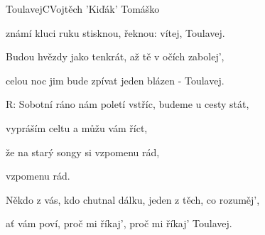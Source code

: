\begin{song}{Toulavej}{C}{Vojtěch 'Kiďák' Tomáško}
\begin{SBVerse}
známí kluci ruku stisknou, řeknou: vítej, Toulavej.

\end{SBVerse}

\begin{SBVerse}

Budou hvězdy jako tenkrát, až tě v očích zabolej',

celou noc jim bude zpívat jeden blázen - Toulavej.

\end{SBVerse}

\begin{SBChorus}

R: Sobotní ráno nám poletí vstříc, budeme u cesty stát,

vypráším celtu a můžu vám říct,

že na starý songy si vzpomenu rád,

vzpomenu rád.

\end{SBChorus}

\begin{SBVerse}

Někdo z vás, kdo chutnal dálku, jeden z těch, co rozuměj',

ať vám poví, proč mi říkaj', proč mi říkaj' Toulavej.

\end{SBVerse}

\end{song}

\clearpage
